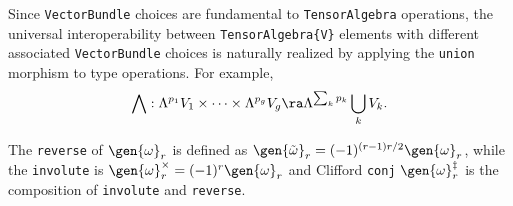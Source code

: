 \documentclass{juliacon}
\begin{document}


Since \verb`VectorBundle` choices are fundamental to \verb`TensorAlgebra` operations, the universal interoperability between \verb`TensorAlgebra{V}` elements with different associated \verb`VectorBundle` choices is naturally realized by applying the \verb`union` morphism to type operations.
For example, $$\bigwedge :\Lambda^{p_1}V_1\times\dots\times\Lambda^{p_g}V_g \ra \Lambda^{\sum_kp_k}\bigcup_k V_k.$$

\begin{definition}
	The \verb`reverse` of $\gen{\omega}_r$ is defined as $\gen{\tilde\omega}_r = (-1)^{(r-1)r/2}\gen{\omega}_r$, while the \verb`involute` is $\gen{\omega}_r^\times=(-1)^r\gen{\omega}_r$ and Clifford \verb`conj`  $\gen{\omega}_r^\ddagger$ is the composition of \verb`involute` and \verb`reverse`.
\end{definition}
\end{document}
